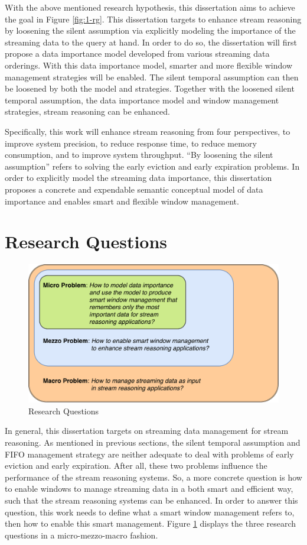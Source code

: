 With the above mentioned research hypothesis, this dissertation aims to achieve the goal in Figure \ref{fig:1-rg}.
This dissertation targets to enhance stream reasoning by loosening the silent assumption via explicitly modeling the importance of the streaming data to the query at hand.
In order to do so, the dissertation will first propose a data importance model developed from various streaming data orderings. 
With this data importance model, smarter and more flexible window management strategies will be enabled. 
The silent temporal assumption can then be loosened by both the model and strategies.
Together with the loosened silent temporal assumption, the data importance model and window management strategies, stream reasoning can be enhanced. 

Specifically, this work will enhance stream reasoning from four perspectives, to improve system precision, to reduce response time, to reduce memory consumption, and to improve system throughput. 
``By loosening the silent assumption'' refers to solving the early eviction and early expiration problems. 
In order to explicitly model the streaming data importance, this dissertation proposes a concrete and expendable semantic conceptual model of data importance and enables smart and flexible window management. 
%
\section{Research Questions}

\begin{figure}[!htbp]
	\centering
	\includegraphics[width=5in]{img/1-rq.pdf}
	\caption{Research Questions}
	\label{fig:1-rq} 
\end{figure}

In general, this dissertation targets on streaming data management for stream reasoning. 
As mentioned in previous sections, the silent temporal assumption and FIFO management strategy are neither adequate to deal with problems of early eviction and early expiration. 
After all, these two problems influence the performance of the stream reasoning systems. 
So, a more concrete question is how to enable windows to manage streaming data in a both smart and efficient way, such that the stream reasoning systems can be enhanced. 
In order to answer this question, this work needs to define what a smart window management refers to, then how to enable this smart management. 
Figure \ref{fig:1-rq} displays the three research questions in a micro-mezzo-macro \cite{lacasse2015making} fashion.

